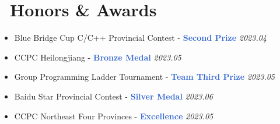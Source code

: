 \documentclass{resume}
\newcommand{\highlight}[1]{\textcolor{highlight}{\textbf{#1}}}
\begin{document}
\section{\faTrophy~Honors \& Awards}
\begin{itemize}
  \item Blue Bridge Cup C/C++ Provincial Contest - \highlight{Second Prize} \hfill \textit{2023.04}
  \item CCPC Heilongjiang - \highlight{Bronze Medal} \hfill \textit{2023.05}
  \item Group Programming Ladder Tournament - \highlight{Team Third Prize} \hfill \textit{2023.05}
  \item Baidu Star Provincial Contest - \highlight{Silver Medal} \hfill \textit{2023.06}
  \item CCPC Northeast Four Provinces - \highlight{Excellence} \hfill \textit{2023.05}
\end{itemize}
\end{document}
